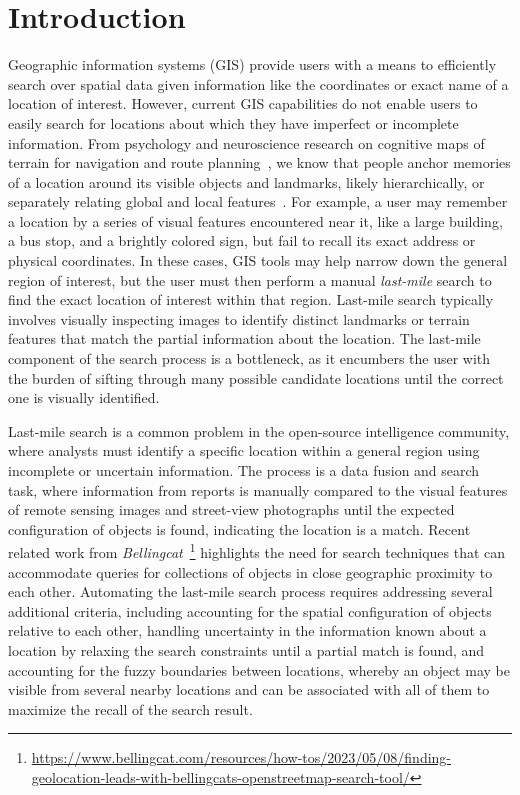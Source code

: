 \section{Introduction}
\label{section:introduction}
Geographic information systems (GIS) provide users with a means to efficiently search over spatial data given information like the coordinates or exact name of a location of interest. 
However, current GIS capabilities do not enable users to easily search for locations about which they have imperfect or incomplete information. 
From psychology and neuroscience research on cognitive maps of terrain for navigation and route planning~\cite{Weisberg2016, Miller2013, Keatley2021}, we know that people anchor memories of a location around its visible objects and landmarks, likely hierarchically, or separately relating global and local features~\cite{Weisberg2016}. 
For example, a user may remember a location by a series of visual features encountered near it, like a large building, a bus stop, and a brightly colored sign, but fail to recall its exact address or physical coordinates. 
In these cases, GIS tools may help narrow down the general region of interest, but the user must then perform a manual \emph{last-mile} search to find the exact location of interest within that region. 
Last-mile search typically involves visually inspecting images to identify distinct landmarks or terrain features that match the partial information about the location. 
The last-mile component of the search process is a bottleneck, as it encumbers the user with the burden of sifting through many possible candidate locations until the correct one is visually identified. 

Last-mile search is a common problem in the open-source intelligence community, where analysts must identify a specific location within a general region using incomplete or uncertain information. 
The process is a data fusion and search task, where information from reports is manually compared to the visual features of remote sensing images and street-view photographs until the expected configuration of objects is found, indicating the location is a match.
Recent related work from \textit{Bellingcat}~\footnote{\href{https://www.bellingcat.com/resources/how-tos/2023/05/08/finding-geolocation-leads-with-bellingcats-openstreetmap-search-tool/}{https://www.bellingcat.com/resources/how-tos/2023/05/08/finding-geolocation-leads-with-bellingcats-openstreetmap-search-tool/}} highlights the need for search techniques that can accommodate queries for collections of objects in close geographic proximity to each other.
Automating the last-mile search process requires addressing several additional criteria, including accounting for the spatial configuration of objects relative to each other, handling uncertainty in the information known about a location by relaxing the search constraints until a partial match is found, and accounting for the fuzzy boundaries between locations, whereby an object may be visible from several nearby locations and can be associated with all of them to maximize the recall of the search result.

